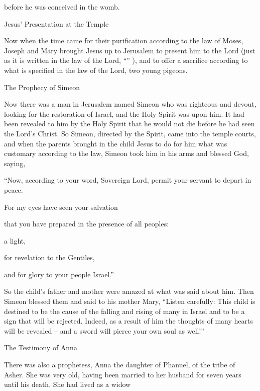 {before
he
was conceived
in
the womb.
\par }{\SH Jesus’ Presentation at the Temple
\par }{\PP {}Now
when
the time
came
for their
purification
according to
the law
of Moses,
Joseph and Mary brought
Jesus
up
to
Jerusalem
to present
him to the Lord
(just as
it is written
in
the law
of the Lord, “{}” ),
and
to offer
a sacrifice
according to
what is specified
in
the law
of the Lord,
{}
{}
two
young
pigeons.
\par }{\SH The Prophecy of Simeon
\par }{\PP {}Now
there was
a man
in
Jerusalem
named
Simeon
who
was righteous
and
devout,
looking for
the restoration
of Israel,
and
the Holy
Spirit
was
upon
him.
It
had been revealed
to him
by
the Holy
Spirit
that he would not
die
before
he had seen
the Lord’s
Christ.
So
Simeon, directed by
the Spirit,
came
into
the temple courts,
and
when the parents
brought in
the child
Jesus
to do
for
him
what was customary
according to
the law,
Simeon
took
him
in
his arms
and
blessed
God,
saying,
\par }{\Q {}“Now,
according to
your
word,
Sovereign Lord,
permit
your
servant
to depart
in
peace.
\par }{\Q {}For
my
eyes
have seen
your
salvation
\par }{\Q {}that
you have prepared
in
the presence
of all
peoples:
\par }{\Q {}a light,
\par }{\Q for
revelation
to the Gentiles,
\par }{\Q and
for glory
to your
people
Israel.”
\par }{\PP {}So
the child’s
father
and
mother
were amazed
at
what was said
about
him.
Then
Simeon
blessed
them
and
said
to
his
mother
Mary,
“Listen carefully: This child
is destined to be the cause of
the falling
and
rising
of many
in
Israel
and
to be
a sign
that will be rejected.
Indeed,
as a result of him the thoughts
of
many
hearts
will be revealed –
and a sword
will pierce
your own
soul as well!”
\par }{\SH The Testimony of Anna
\par }{\PP {}There was
also
a prophetess,
Anna
the daughter
of Phanuel,
of
the tribe
of Asher.
She
was
very
old,
having been married
to
her husband
for seven
years until his death.
She
had lived as a widow
}
